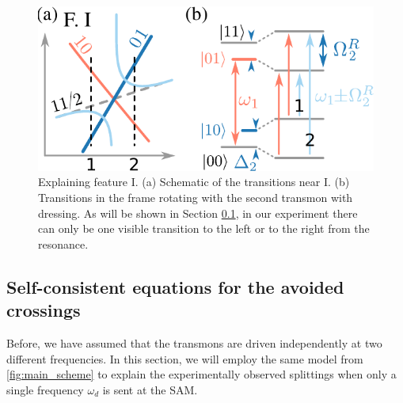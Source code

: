 \documentclass[%
 aps, prx,
 amsmath,amssymb,
 reprint,%
superscriptaddress
]{revtex4-2}
\begin{document}
\begin{figure}
	\includegraphics[width=.9\linewidth]{topo_scheme}
	\caption{Explaining feature I. (a) Schematic of the transitions near I. (b) Transitions in the frame rotating with the second transmon with dressing. As will be shown in Section \ref{sec:münchhausen}, in our experiment there can only be one visible transition to the left or to the right from the resonance.}
	\label{fig:featureI}
\end{figure} 



\subsection{Self-consistent equations for the avoided crossings}
\label{sec:münchhausen}

Before, we have assumed that the transmons are driven independently at two different frequencies. In this section, we will employ the same model from \autoref{fig:main_scheme} to explain the experimentally observed splittings when only a single frequency $\omega_d$ is sent at the SAM. 
\end{document}
